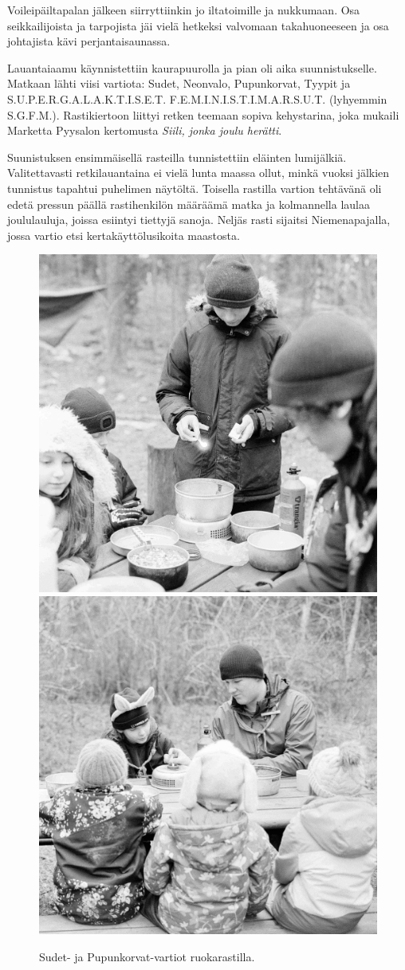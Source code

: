 \begin{multicols}{2}
Voileipäiltapalan jälkeen siirryttiinkin jo iltatoimille ja nukkumaan. Osa 
seikkailijoista ja tarpojista jäi vielä hetkeksi valvomaan takahuoneeseen ja 
osa johtajista kävi perjantaisaunassa.

Lauantaiaamu käynnistettiin kaurapuurolla ja pian oli aika suunnistukselle. 
Matkaan lähti viisi vartiota: Sudet, Neonvalo, Pupunkorvat, Tyypit ja 
S.U.P.E.R.G.A.L.A.K.T.I.S.E.T. F.E.M.I.N.I.S.T.I.M.A.R.S.U.T. (lyhyemmin 
S.G.F.M.). Rastikiertoon liittyi retken teemaan sopiva kehystarina, joka 
mukaili Marketta Pyysalon kertomusta \textit{Siili, jonka joulu herätti}. 

Suunistuksen ensimmäisellä rasteilla tunnistettiin eläinten lumijälkiä. 
Valitettavasti retkilauantaina ei vielä lunta maassa ollut, minkä vuoksi 
jälkien tunnistus tapahtui puhelimen näytöltä. Toisella rastilla vartion 
tehtävänä oli edetä pressun päällä rastihenkilön määräämä matka ja 
kolmannella laulaa joululauluja, joissa esiintyi tiettyjä sanoja. Neljäs 
rasti sijaitsi Niemenapajalla, jossa vartio etsi kertakäyttölusikoita 
maastosta.

\begin{figure}[!t]
\centering\includegraphics[width=.475\textwidth]{assets/meriharjuRuoka1}\hfill\includegraphics[width=.475\textwidth]{assets/meriharjuRuoka2}
\caption{Sudet- ja Pupunkorvat-vartiot ruokarastilla.}
\end{figure}


\end{multicols}
